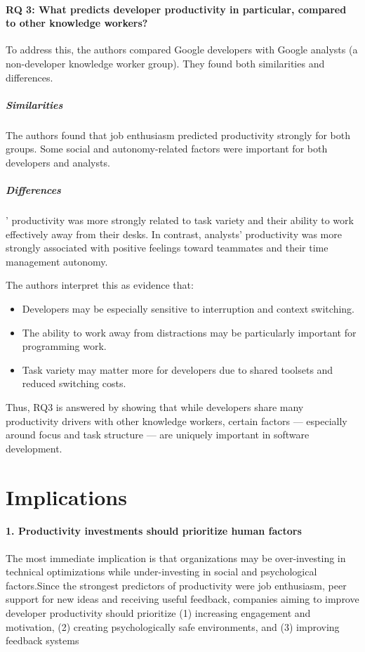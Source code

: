 \paragraph{RQ 3: What predicts developer productivity in particular, compared to other knowledge workers?}
To address this, the authors compared Google developers with Google analysts (a non-developer knowledge worker group). They found both similarities and differences.
\subparagraph{Similarities}
The authors found that job enthusiasm predicted productivity strongly for both groups. Some social and autonomy-related factors were important for both developers and analysts.

\subparagraph{Differences}
' productivity was more strongly related to task variety and their ability to work effectively away from their desks. In contrast, analysts' productivity was more strongly associated with positive feelings toward teammates and their time management autonomy.

The authors interpret this as evidence that:
\begin{itemize}
    \item Developers may be especially sensitive to interruption and context switching.
    \item The ability to work away from distractions may be particularly important for programming work.
    \item Task variety may matter more for developers due to shared toolsets and reduced switching costs.
\end{itemize}
Thus, RQ3 is answered by showing that while developers share many productivity drivers with other knowledge workers, certain factors — especially around focus and task structure — are uniquely important in software development.

\section{Implications}
\paragraph{1. Productivity investments should prioritize human factors}
The most immediate implication is that organizations may be over-investing in technical optimizations while under-investing in social and psychological factors.Since the strongest predictors of productivity were job enthusiasm, peer support for new ideas and receiving useful feedback, companies aiming to improve developer productivity should prioritize (1) increasing engagement and motivation, (2) creating psychologically safe environments, and (3) improving feedback systems

